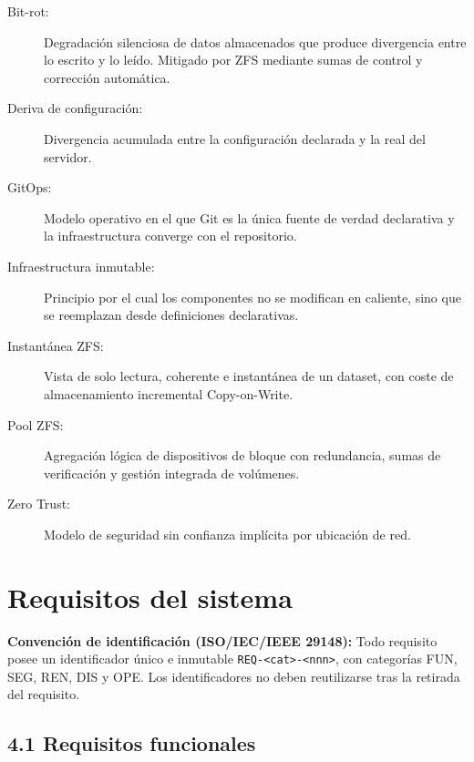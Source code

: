 \documentclass[10pt,a4paper]{article}
\begin{document}
\begin{description}
    \item[Bit-rot:] Degradación silenciosa de datos almacenados que produce divergencia entre lo escrito y lo leído. Mitigado por ZFS mediante sumas de control y corrección automática.
    \item[Deriva de configuración:] Divergencia acumulada entre la configuración declarada y la real del servidor.
    \item[GitOps:] Modelo operativo en el que Git es la única fuente de verdad declarativa y la infraestructura converge con el repositorio.
    \item[Infraestructura inmutable:] Principio por el cual los componentes no se modifican en caliente, sino que se reemplazan desde definiciones declarativas.
    \item[Instantánea ZFS:] Vista de solo lectura, coherente e instantánea de un dataset, con coste de almacenamiento incremental Copy-on-Write.
    \item[Pool ZFS:] Agregación lógica de dispositivos de bloque con redundancia, sumas de verificación y gestión integrada de volúmenes.
    \item[Zero Trust:] Modelo de seguridad sin confianza implícita por ubicación de red.
\end{description}

\newpage
\section{Requisitos del sistema}

\begin{normativabox}{}
\textbf{Convención de identificación (ISO/IEC/IEEE 29148):} Todo requisito posee un identificador único e inmutable \texttt{REQ-<cat>-<nnn>}, con categorías FUN, SEG, REN, DIS y OPE. Los identificadores no deben reutilizarse tras la retirada del requisito.
\end{normativabox}

\subsection{4.1 Requisitos funcionales}
\end{document}
